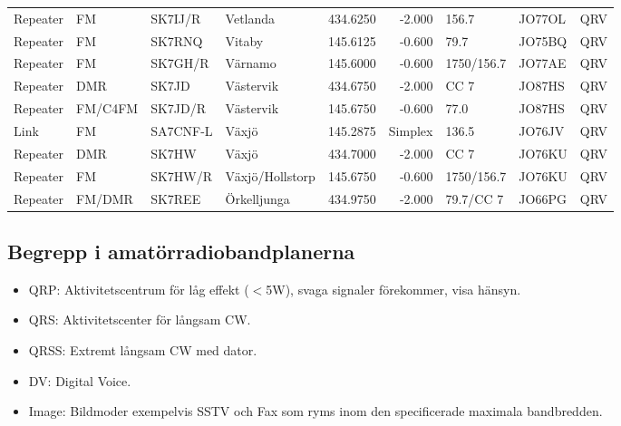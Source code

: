\begin{landscape}
\begin{longtable}{llllrrlll}
	Repeater & FM              & SK7IJ/R  & Vetlanda             &     434.6250 &     -2.000 & 156.7             & JO77OL      & QRV      \\
	Repeater & FM              & SK7RNQ   & Vitaby               &     145.6125 &     -0.600 & 79.7              & JO75BQ      & QRV      \\
	Repeater & FM              & SK7GH/R  & Värnamo              &     145.6000 &     -0.600 & 1750/156.7        & JO77AE      & QRV      \\
	Repeater & DMR             & SK7JD    & Västervik            &     434.6750 &     -2.000 & CC 7              & JO87HS      & QRV      \\
	Repeater & FM/C4FM         & SK7JD/R  & Västervik            &     145.6750 &     -0.600 & 77.0              & JO87HS      & QRV      \\
	Link     & FM              & SA7CNF-L & Växjö                &     145.2875 &    Simplex & 136.5             & JO76JV      & QRV      \\
	Repeater & DMR             & SK7HW    & Växjö                &     434.7000 &     -2.000 & CC 7              & JO76KU      & QRV      \\
	Repeater & FM              & SK7HW/R  & Växjö/Hollstorp      &     145.6750 &     -0.600 & 1750/156.7        & JO76KU      & QRV      \\
	Repeater & FM/DMR          & SK7REE   & Örkelljunga          &     434.9750 &     -2.000 & 79.7/CC 7         & JO66PG      & QRV     
\end{longtable}


\end{landscape}


\clearpage

\subsection{Begrepp i amatörradiobandplanerna}

\begin{itemize}
\item QRP: Aktivitetscentrum för låg effekt ($<$5W), svaga signaler
      förekommer, visa hänsyn.
\item QRS: Aktivitetscenter för långsam CW.
\item QRSS: Extremt långsam CW med dator.
\item DV: Digital Voice.
\item Image: Bildmoder exempelvis SSTV och Fax som ryms inom den specificerade
	  maximala bandbredden.
\end{itemize}

